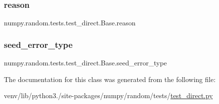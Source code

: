 \subsubsection{\texorpdfstring{reason}{reason}}
{\footnotesize\ttfamily numpy.\+random.\+tests.\+test\+\_\+direct.\+Base.\+reason\hspace{0.3cm}{\ttfamily [static]}}

\mbox{\label{classnumpy_1_1random_1_1tests_1_1test__direct_1_1Base_ad0a94be8c19dcec62261b8204b88ee77}} 
\subsubsection{\texorpdfstring{seed\+\_\+error\+\_\+type}{seed\_error\_type}}
{\footnotesize\ttfamily numpy.\+random.\+tests.\+test\+\_\+direct.\+Base.\+seed\+\_\+error\+\_\+type}



The documentation for this class was generated from the following file\+:\begin{DoxyCompactItemize}
\item 
venv/lib/python3./site-\/packages/numpy/random/tests/\hyperlink{test__direct_8py}{test\+\_\+direct.\+py}\end{DoxyCompactItemize}

